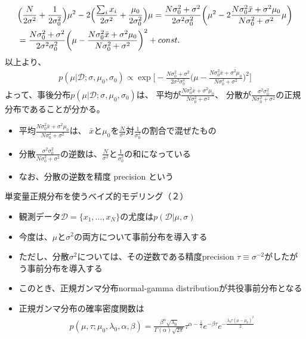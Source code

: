 \documentclass[aspectratio=169,unicode,dvipdfmx,14pt]{beamer}
\begin{document}
\begin{frame}
\FontMath
\begin{align}
& \Big( \frac{N}{2\sigma^2} + \frac{1}{2\sigma_0^2} \Big) \mu^2 
- 2 \Big( \frac{ \sum_i x_i}{2\sigma^2} + \frac{\mu_0}{2\sigma_0^2} \Big) \mu 
=
\frac{N\sigma_0^2 + \sigma^2}{2\sigma^2\sigma_0^2} \bigg(
\mu^2 
-  2\frac{ N \sigma_0^2 \bar{x}  + \sigma^2 \mu_0 }{ N\sigma_0^2 + \sigma^2 } \mu \bigg)
\notag \\ & =
\frac{N\sigma_0^2 + \sigma^2}{2\sigma^2\sigma_0^2}
\bigg( \mu - \frac{ N \sigma_0^2 \bar{x}  + \sigma^2 \mu_0 }{ N\sigma_0^2 + \sigma^2 } \bigg)^2
+ const.
\end{align}
以上より、
\begin{align}
p(\mu | \mathcal{D}; \sigma, \mu_0, \sigma_0)
\propto \exp\bigg[
- \frac{N\sigma_0^2 + \sigma^2}{2\sigma^2\sigma_0^2}
\bigg( \mu - \frac{ N \sigma_0^2 \bar{x}  + \sigma^2 \mu_0 }{ N\sigma_0^2 + \sigma^2 } \bigg)^2
\bigg]
\end{align}
よって、事後分布$p(\mu | \mathcal{D}; \sigma, \mu_0, \sigma_0)$は、
平均が$\frac{ N \sigma_0^2 \bar{x}  + \sigma^2 \mu_0 }{ N\sigma_0^2 + \sigma^2 }$、
分散が$\frac{\sigma^2\sigma_0^2}{N\sigma_0^2 + \sigma^2}$の正規分布であることが分かる。
\begin{itemize}
\item 平均$\frac{ N \sigma_0^2 \bar{x}  + \sigma^2 \mu_0 }{ N\sigma_0^2 + \sigma^2 }$は、
$\bar{x}$と$\mu_0$を$\frac{N}{\sigma^2}$対$\frac{1}{\sigma_0^2}$の割合で混ぜたもの
\item 分散$\frac{\sigma^2\sigma_0^2}{N\sigma_0^2 + \sigma^2}$の逆数は、$\frac{N}{\sigma^2}$と$\frac{1}{\sigma_0^2}$の和になっている
\item なお、分散の逆数を精度 precision という
\end{itemize}
\end{frame}

\begin{frame}{単変量正規分布を使うベイズ的モデリング（２）}
\begin{itemize}
\item 観測データ$\mathcal{D}=\{x_1,\ldots,x_N\}$の尤度は$p(\mathcal{D}|\mu,\sigma)$
\item 今度は、$\mu$と$\sigma^2$の両方について事前分布を導入する
\item ただし、分散$\sigma^2$については、その逆数である精度precision $\tau \equiv \sigma^{-2}$がしたがう事前分布を導入する
\item このとき、正規ガンマ分布normal-gamma distributionが共役事前分布となる
\item 正規ガンマ分布の確率密度関数は
\begin{align}
p(\mu, \tau ; \mu_0, \lambda_0, \alpha, \beta)
= \frac{\beta^\alpha\sqrt{\lambda_0}}{\Gamma(\alpha)\sqrt{2\pi}}
\tau^{\alpha-\frac{1}{2}}e^{-\beta\tau}e^{-\frac{\lambda_0\tau(\mu - \mu_0)^2}{2}}
\end{align}
\end{itemize}
\end{frame}
\end{document}

